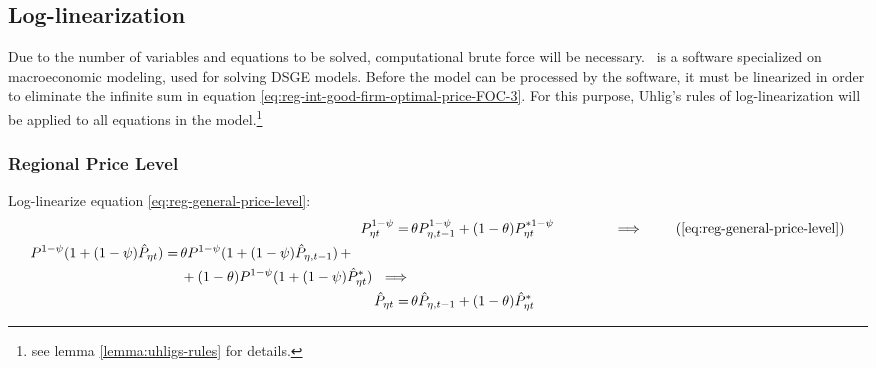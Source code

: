 \documentclass[../thesis.tex]{subfiles}
\begin{document}
		\begin{comment}
			Y_{1} &= \left[ \left( \frac{a_{1}}{1 - b_{1}} \right) \left( \frac{1}{\omega_{11}^{\omega_{11}} (1 - \omega_{11})^{1 - \omega_{11}}} \right) \right]^{\frac{\sigma}{\sigma + \varphi}} \tag{\ref{eq:reg-ss-total-y1}}
			\\
			Y_{2} &= \left[ \left( \frac{a_{2}}{1 - b_{2}} \right) \left( \frac{1}{\omega_{21}^{\omega_{21}} (1 - \omega_{21})^{1 - \omega_{21}}} \right) \right]^{\frac{\sigma}{\sigma + \varphi}} \tag{\ref{eq:reg-ss-total-y2}}
			\\
		\end{comment}

	\newpage
	
	
\subsection{Log-linearization}
	
	Due to the number of variables and equations to be solved, computational brute force will be necessary. \dynare \ is a software specialized on macroeconomic modeling, used for solving DSGE models. Before the model can be processed by the software, it must be linearized in order to eliminate the infinite sum in equation \ref{eq:reg-int-good-firm-optimal-price-FOC-3}. For this purpose, Uhlig's rules of log-linearization \cite{uhlig_toolkit_1999} will be applied to all equations in the model.\footnote{see lemma \ref{lemma:uhligs-rules} for details.}


\subsubsection*{Regional Price Level}

Log-linearize equation \ref{eq:reg-general-price-level}:
\begin{align}
	P_{\eta t}^{1-\psi} =\, &\theta P_{\eta, t-1}^{1-\psi} + (1-\theta) P_{\eta t}^{\ast 1-\psi} \qquad \qquad \implies \tag{\ref{eq:reg-general-price-level}} \\
	\begin{split} P^{1-\psi} (1 + (1-\psi)\hat{P}_{\eta t}) =\, &\theta P^{1-\psi} (1 + (1-\psi)\hat{P}_{\eta, t-1}) \, + \\ & + (1-\theta) P^{1-\psi} (1 + (1-\psi)\hat{P}_{\eta t}^{\ast}) \ \implies \nonumber \end{split} \\
	\hat{P}_{\eta t} =\, &\theta \hat{P}_{\eta, t-1} + (1-\theta) \hat{P}_{\eta t}^{\ast}
	\label{eq:reg-ll-general-price-level}
\end{align}
\end{document}
